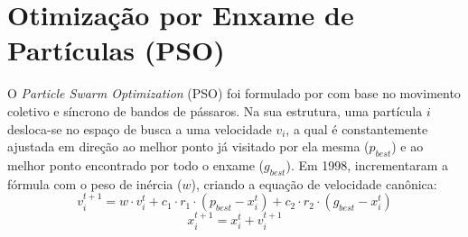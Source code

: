 \documentclass[12pt, a4paper, oneside]{report}
\begin{document}
\section{Otimização por Enxame de Partículas (PSO)}
O \textit{Particle Swarm Optimization} (PSO) foi formulado por \citet{kennedy1995particle} com base no movimento coletivo e síncrono de bandos de pássaros. Na sua estrutura, uma partícula $i$ desloca-se no espaço de busca a uma velocidade $v_i$, a qual é constantemente ajustada em direção ao melhor ponto já visitado por ela mesma ($p_{best}$) e ao melhor ponto encontrado por todo o enxame ($g_{best}$). Em 1998, \citet{shi1998modified} incrementaram a fórmula com o peso de inércia ($w$), criando a equação de velocidade canônica:
\begin{equation}
    v_{i}^{t+1} = w \cdot v_{i}^t + c_1 \cdot r_1 \cdot (p_{best} - x_{i}^t) + c_2 \cdot r_2 \cdot (g_{best} - x_{i}^t)
\end{equation}
\begin{equation}
    x_{i}^{t+1} = x_{i}^t + v_{i}^{t+1}
\end{equation}
\end{document}

